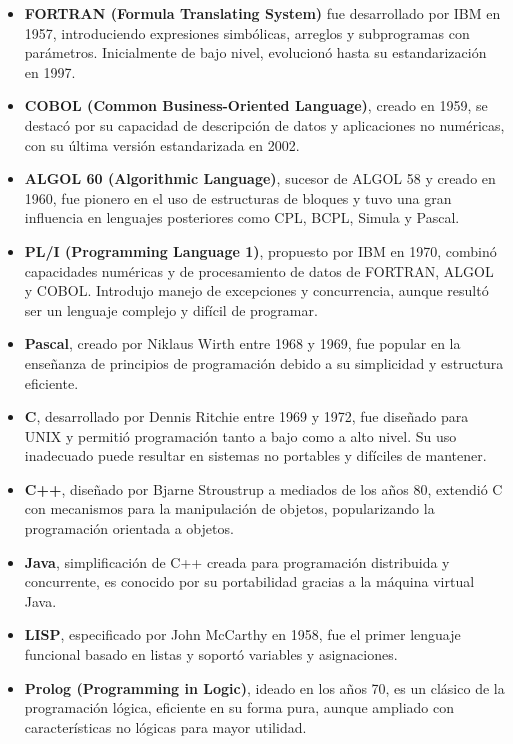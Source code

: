 \documentclass{report}
\theoremstyle{mytheoremstyle}
\theoremstyle{mytheoremstyle}
\theoremstyle{myproblemstyle}
\begin{document}
    \begin{itemize}
        \item \textbf{FORTRAN (Formula Translating System)} fue desarrollado por IBM en 1957, introduciendo expresiones simbólicas, arreglos y subprogramas con parámetros. Inicialmente de bajo nivel, evolucionó hasta su estandarización en 1997.
        \item \textbf{COBOL (Common Business-Oriented Language)}, creado en 1959, se destacó por su capacidad de descripción de datos y aplicaciones no numéricas, con su última versión estandarizada en 2002.
        \item \textbf{ALGOL 60 (Algorithmic Language)}, sucesor de ALGOL 58 y creado en 1960, fue pionero en el uso de estructuras de bloques y tuvo una gran influencia en lenguajes posteriores como CPL, BCPL, Simula y Pascal.
        \item \textbf{PL/I (Programming Language 1)}, propuesto por IBM en 1970, combinó capacidades numéricas y de procesamiento de datos de FORTRAN, ALGOL y COBOL. Introdujo manejo de excepciones y concurrencia, aunque resultó ser un lenguaje complejo y difícil de programar.
        \item \textbf{Pascal}, creado por Niklaus Wirth entre 1968 y 1969, fue popular en la enseñanza de principios de programación debido a su simplicidad y estructura eficiente.
        \item \textbf{C}, desarrollado por Dennis Ritchie entre 1969 y 1972, fue diseñado para UNIX y permitió programación tanto a bajo como a alto nivel. Su uso inadecuado puede resultar en sistemas no portables y difíciles de mantener.
        \item \textbf{C++}, diseñado por Bjarne Stroustrup a mediados de los años 80, extendió C con mecanismos para la manipulación de objetos, popularizando la programación orientada a objetos.
        \item \textbf{Java}, simplificación de C++ creada para programación distribuida y concurrente, es conocido por su portabilidad gracias a la máquina virtual Java.
        \item \textbf{LISP}, especificado por John McCarthy en 1958, fue el primer lenguaje funcional basado en listas y soportó variables y asignaciones.
        \item \textbf{Prolog (Programming in Logic)}, ideado en los años 70, es un clásico de la programación lógica, eficiente en su forma pura, aunque ampliado con características no lógicas para mayor utilidad.
    \end{itemize}
\end{document}
